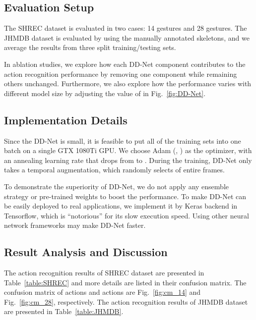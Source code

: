 \documentclass[journal]{IEEEtran}
\begin{document}
\subsection{Evaluation Setup}

The SHREC dataset is evaluated in two cases: 14 gestures and 28 gestures. The JHMDB dataset is evaluated by using the manually annotated skeletons, and we average the results from three split training/testing sets.

In ablation studies, we explore how each DD-Net component contributes to the action recognition performance by removing one component while remaining others unchanged. Furthermore, we also explore how the performance varies with different model size by adjusting the value of  in Fig.~\textcolor{red}{\ref{fig:DD-Net}}.


\subsection{Implementation Details}
Since the DD-Net is small, it is feasible to put all of the training sets into one batch on a single GTX 1080Ti GPU. We choose Adam (, ) \cite{kingma2014adam} as the optimizer, with an annealing learning rate that drops from  to . During the training, DD-Net only takes a temporal augmentation, which randomly selects  of entire frames.


To demonstrate the superiority of DD-Net, we do not apply any ensemble strategy or pre-trained weights to boost the performance. To make DD-Net can be easily deployed to real applications, we implement it by Keras \cite{chollet2015keras} backend in Tensorflow, which is ``notorious'' for its slow execution speed. Using other neural network frameworks may make DD-Net faster.




\subsection{Result Analysis and Discussion}


The action recognition results of SHREC dataset are presented in Table~\textcolor{red}{\ref{table:SHREC}} and more details are listed in their confusion matrix. The confusion matrix of  actions and  actions are  Fig.~\textcolor{red}{\ref{fig:cm_14}} and Fig.~\textcolor{red}{\ref{fig:cm_28}}, respectively. The action recognition results of JHMDB dataset are presented in Table~\textcolor{red}{\ref{table:JHMDB}}.
\end{document}
